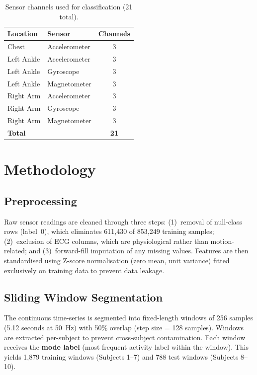 \documentclass[10pt,twocolumn,letterpaper]{article}
\begin{document}
\begin{table}[H]
\centering
\caption{Sensor channels used for classification (21 total).}
\label{tab:sensors}
\small
\begin{tabular}{llc}
\toprule
\textbf{Location} & \textbf{Sensor} & \textbf{Channels} \\
\midrule
Chest      & Accelerometer       & 3 \\
Left Ankle & Accelerometer       & 3 \\
Left Ankle & Gyroscope           & 3 \\
Left Ankle & Magnetometer        & 3 \\
Right Arm  & Accelerometer       & 3 \\
Right Arm  & Gyroscope           & 3 \\
Right Arm  & Magnetometer        & 3 \\
\midrule
\multicolumn{2}{l}{\textbf{Total}} & \textbf{21} \\
\bottomrule
\end{tabular}
\end{table}

\section{Methodology}

\subsection{Preprocessing}
Raw sensor readings are cleaned through three steps: (1)~removal of null-class rows (label~0), which eliminates 611,430 of 853,249 training samples; (2)~exclusion of ECG columns, which are physiological rather than motion-related; and (3)~forward-fill imputation of any missing values. Features are then standardised using Z-score normalisation (zero mean, unit variance) fitted exclusively on training data to prevent data leakage.

\subsection{Sliding Window Segmentation}
The continuous time-series is segmented into fixed-length windows of 256 samples (5.12 seconds at 50~Hz) with 50\% overlap (step size = 128 samples). Windows are extracted per-subject to prevent cross-subject contamination. Each window receives the \textbf{mode label} (most frequent activity label within the window). This yields 1,879 training windows (Subjects 1--7) and 788 test windows (Subjects 8--10).
\end{document}
